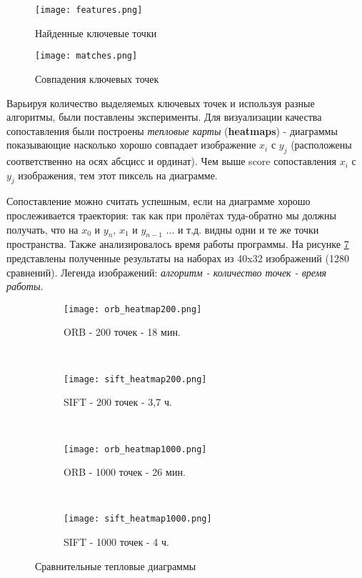\begin{figure}[h]
    \centering
    \texttt{[image: features.png]}
    \caption{Найденные ключевые точки}
    \label{fig:features}
\end{figure}

\begin{figure}[h]
    \centering
    \texttt{[image: matches.png]}
    \caption{Совпадения ключевых точек}
    \label{fig:matches}
\end{figure}

Варьируя количество выделяемых ключевых точек и используя разные алгоритмы, были поставлены эксперименты. Для визуализации качества сопоставления были построены \textit{тепловые карты} (\textbf{heatmaps}) - диаграммы показывающие насколько хорошо совпадает изображение $x_i$ с $y_j$ (расположены соответственно на осях абсцисс и ординат). Чем выше score сопоставления $x_i$ с $y_j$ изображения, тем  этот пиксель на диаграмме.

Сопоставление можно считать успешным, если на диаграмме хорошо прослеживается траектория: так как при пролётах туда-обратно мы должны получать, что на $x_0$ и $y_n$, $x_1$ и $y_{n-1}$ ... и т.д. видны одни и те же точки пространства. Также анализировалось время работы программы. На рисунке \ref{fig:heatmaps} представлены полученные результаты на наборах из 40x32 изображений (1280 сравнений). Легенда изображений: \textit{алгоритм - количество точек - время работы}.

\begin{figure}[h]
    \centering
    \begin{subfigure}[h]{0.45\textwidth}
        \texttt{[image: orb\_heatmap200.png]}
        \caption{ORB - 200 точек - 18 мин.}
        \label{fig:orb_200}
    \end{subfigure}
    ~ 
    \begin{subfigure}[h]{0.45\textwidth}
        \texttt{[image: sift\_heatmap200.png]}
        \caption{SIFT - 200 точек - 3,7 ч.}
        \label{fig:sift_200}
    \end{subfigure}
    ~ 
    \begin{subfigure}[h]{0.45\textwidth}
        \texttt{[image: orb\_heatmap1000.png]}
        \caption{ORB - 1000 точек - 26 мин.}
        \label{fig:mouse}
    \end{subfigure}
    ~
    \begin{subfigure}[h]{0.45\textwidth}
        \texttt{[image: sift\_heatmap1000.png]}
        \caption{SIFT - 1000 точек - 4 ч.}
        \label{fig:mouse}
    \end{subfigure}
    \caption{Сравнительные тепловые диаграммы}
    \label{fig:heatmaps}
\end{figure}

